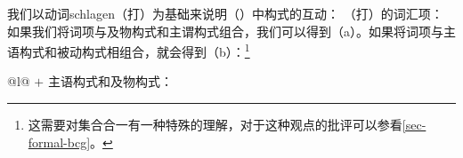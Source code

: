 我们以动词schlagen（打）为基础来说明（）中构式的互动：
\eas
{}（打）的词汇项：\\
\zs
如果我们将词项与及物构式和主谓构式组合，我们可以得到（a）。如果将词项与主语构式和被动构式相组合，就会得到（b）：\footnote{
	这需要对集合合一有一种特殊的理解，对于这种观点的批评可以参看\ref{sec-formal-bcg}。
}
\eal
\label{ex-schlagen-linking}
\ex 
\label{ex-schlagen-transitive}
\begin{tabular}[t]{@{}l@{}}
 $+$ 主语构式和及物构式：\\
\end{tabular}
